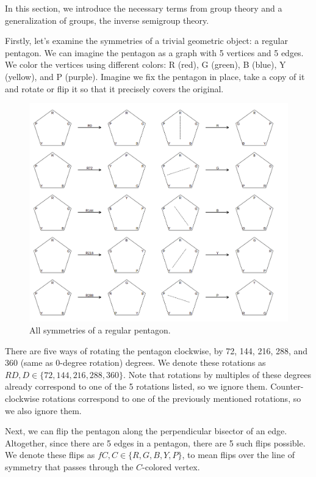 In this section, we introduce the necessary terms from group theory and a generalization of groups, the inverse semigroup theory.

Firstly, let's examine the symmetries of a trivial geometric object: a regular pentagon. We can imagine the pentagon as a graph with 5 vertices and 5 edges. We color the vertices using different colors: R (red), G (green), B (blue), Y (yellow), and P (purple). Imagine we fix the pentagon in place, take a copy of it and rotate or flip it so that it precisely covers the original.

\begin{figure}[H]
\includegraphics[width=\textwidth,height=\textheight,keepaspectratio]{images/pentagon.png}
\caption{All symmetries of a regular pentagon.}
\label{fig:pentagon_symmetries}
\end{figure}

There are five ways of rotating the pentagon clockwise, by 72, 144, 216, 288, and 360 (same as 0-degree rotation) degrees. We denote these rotations as $RD, D \in \{ 72, 144, 216, 288, 360 \}$. Note that rotations by multiples of these degrees already correspond to one of the 5 rotations listed, so we ignore them. Counter-clockwise rotations correspond to one of the previously mentioned rotations, so we also ignore them.

Next, we can flip the pentagon along the perpendicular bisector of an edge. Altogether, since there are 5 edges in a pentagon, there are 5 such flips possible. We denote these flips as $fC, C \in \{R, G, B, Y, P\}$, to mean flips over the line of symmetry that passes through the $C$-colored vertex.

